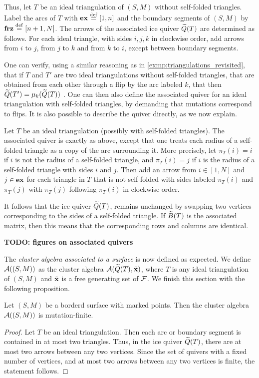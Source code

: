 Thus, let $T$ be an ideal triangulation of $(S, M)$ without self-folded triangles.
Label the arcs of $T$ with $\mathbf{ex} \overset{\mathrm{def}}{=} [1,n]$ and the boundary segments of $(S, M)$ by
$\mathbf{frz} \overset{\mathrm{def}}{=} [n+1, N]$. The arrows of the associated ice quiver $\widetilde{Q}(T)$ are determined
as follows. For each ideal triangle, with sides $i,j,k$ in clockwise order, add arrows
from $i$ to $j$, from $j$ to $k$ and from $k$ to $i$, except between boundary segments.

One can verify, using a similar reasoning as in \cref{exmp:triangulations_revisited},
that if $T$ and $T'$ are two ideal triangulations without self-folded triangles, that
are obtained from each other through a flip by the arc labeled $k$, that then $\widetilde{Q}(T')
	= \mu_k(\widetilde{Q}(T))$ \parencite[Proposition 4.8]{FominShapiroThurston2008CATriangulatedSurfacesI}. One can then
also define the associated quiver for an ideal triangulation with self-folded
triangles, by demanding that mutations correspond to flips. It is also possible to
describe the quiver directly, as we now explain.

Let $T$ be an ideal triangulation (possibly with self-folded triangles). The associated
quiver is exactly as above, except that one treats each radius of a self-folded
triangle as a copy of the arc surrounding it. More precisely, let $\pi_T(i) = i$ if $i$
is not the radius of a self-folded triangle, and $\pi_T(i) = j$ if $i$ is the radius of
a self-folded triangle with sides $i$ and $j$. Then add an arrow from $i \in [1, N]$
and $j \in \mathbf{ex}$ for each triangle in $T$ that is not self-folded with sides labeled
$\pi_T(i)$ and $\pi_T(j)$ with $\pi_T(j)$ following $\pi_T(i)$ in clockwise order.

It follows that the ice quiver $\widetilde{Q}(T)$, remains unchanged by swapping two vertices
corresponding to the sides of a self-folded triangle. If $\widetilde{B}(T)$ is the associated
matrix, then this means that the corresponding rows and columns are identical.

\textbf{TODO: figures on associated quivers}

The \emph{cluster algebra associated to a surface} is now defined as expected. We define $\mathcal{A}((S, M))$ as the cluster algebra $\mathcal{A}(\widetilde{Q}(T), \tilde{\mathbf{x}})$, where $T$ is any ideal triangulation
of $(S, M)$ and $\tilde{\mathbf{x}}$ is a free generating set of $\mathcal{F}$. We finish this section with
the following proposition.

\begin{proposition}

	Let $(S, M)$ be a borderd surface with marked points. Then the cluster algebra
	$\mathcal{A}((S, M))$ is mutation-finite.
\end{proposition}
\begin{proof}

	Let $T$ be an ideal triangulation. Then each arc or boundary segment is contained in at
	most two triangles. Thus, in the ice quiver $\widetilde{Q}(T)$, there are at most two arrows
	between any two vertices. Since the set of quivers with a fixed number of vertices, and
	at most two arrows between any two vertices is finite, the statement follows.
\end{proof}

